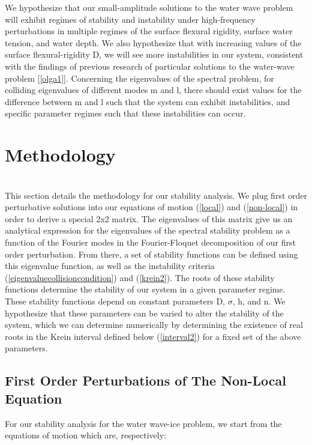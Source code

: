 \documentclass{article}
\begin{document}
We hypothesize that our small-amplitude solutions to the water wave problem will exhibit regimes of stability and instability under high-frequency perturbations in multiple regimes of the surface flexural rigidity, surface water tension, and water depth. We also hypothesize that with increasing values of the surface flexural-rigidity D, we will see more instabilities in our system, consistent with the findings of previous research of particular solutions to the water-wave problem [\ref{olga1}]. Concerning the eigenvalues of the spectral problem, for colliding eigenvalues of different modes m and l, there should exist values for the difference between m and l such that the system can exhibit instabilities, and specific parameter regimes such that these instabilities can occur. 
\\

\section{Methodology}

 \\
 
This section details the methodology for our stability analysis. We plug first order perturbative solutions into our equations of motion (\ref{local}) and (\ref{non-local}) in order to derive a special 2x2 matrix. The eigenvalues of this matrix give us an analytical expression for the eigenvalues of the spectral stability problem as a function of the Fourier modes in the Fourier-Floquet decomposition of our first order perturbation. From there, a set of stability functions can be defined using this eigenvalue function, as well as the instability criteria  (\ref{eigenvaluecollisioncondition}) and (\ref{krein2}). The roots of these stability functions determine the stability of our system in a given parameter regime. These stability functions depend on constant parameters D, \(\sigma\), h, and n. We hypothesize that these parameters can be varied to alter the stability of the system, which we can determine numerically by determining the existence of real roots in the Krein interval defined below (\ref{interval2}) for a fixed set of the above parameters. 
 
\subsection{First Order Perturbations of The Non-Local Equation}

For our stability analysis for the water wave-ice problem, we start from the equations of motion which are, respectively:
\end{document}
